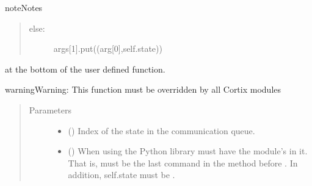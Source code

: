 \documentclass[letterpaper,10pt,openany,oneside,english]{sphinxmanual}
\begin{document}
\begin{fulllineitems}
\begin{fulllineitems}
\begin{sphinxadmonition}{note}{Notes}
\begin{quote}
\begin{description}
\begin{description}
\item[{else:}] \leavevmode
args{[}1{]}.put((arg{[}0{]},self.state))

\end{description}

\end{description}
\end{quote}

at the bottom of the user defined  function.
\end{sphinxadmonition}

\begin{sphinxadmonition}{warning}{Warning:}
This function must be overridden by all Cortix modules
\end{sphinxadmonition}
\begin{quote}\begin{description}
\item[{Parameters}] \leavevmode\begin{itemize}
\item {} 
\sphinxstyleliteralstrong{\sphinxupquote{{[}}}\sphinxstyleliteralstrong{\sphinxupquote{{]}}} () \textendash{} Index of the state in the communication queue.

\item {} 
\sphinxstyleliteralstrong{\sphinxupquote{{[}}}\sphinxstyleliteralstrong{\sphinxupquote{{]}}} () \textendash{} When using the Python  library  must have
the module’s  in it. That is,
 must be the last command in the
method before . In addition, self.state must be .

\end{itemize}

\end{description}\end{quote}

\end{fulllineitems}


\end{fulllineitems}
\end{document}
